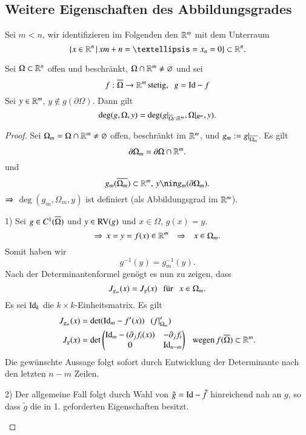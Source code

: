 \subsection{Weitere Eigenschaften des Abbildungsgrades}

Sei $m<n$, wir identifizieren im Folgenden den $\mathbb{R}^m$ mit dem Unterraum
\[
    \{x\in \R^n \, | \, x{m+n}=…=x_n=0\}\subset \R^n.
\]

\begin{theorem}\label{2.14}
    Sei $\Omega \subset \mathbb{R}^n$ offen und beschränkt, $\Omega \cap \mathbb{R}^m \neq \varnothing$ und sei
    \[
        f:\overline \Omega \rightarrow \mathbb{R}^m\, \text{stetig,} \hspace{.25cm} g=\mathrm{Id}-f
    \]
    Sei $y\in \mathbb{R}^m$, $y\nin g(\partial \Omega)$. Dann gilt
    \[
        \deg(g,\Omega,y)=\deg(g|_{\overline{\Omega}\cap\mathbb{R}^m},\Omega|_{R^m},y).
    \]
\end{theorem}

\begin{proof}
    Sei $\Omega_m=\Omega\cap\mathbb{R}^m\neq \varnothing$ offen, beschränkt im $\mathbb{R}^m$, und
    $g_m:=g|_{\overline{\Omega_m}}$. Es gilt
    \[
        \partial \Omega_m=\partial\Omega\cap\mathbb{R}^m.
    \]
    und
    \[
        g_m(\ol{\Omega_m})\subset\R^m,\, y\nin g_m(\partial\Omega_m).
    \]
    $\Rightarrow$ $\deg(g_m,\Omega_m,y)$ ist definiert (als Abbildungsgrad im $\mathbb{R}^m$).
    \begin{description}
        \item{1)}
        Sei $g\in C^1(\overline \Omega)$ und $y\in \mathrm{RV}(g)$ und $x\in \Omega$, $g(x)=y$.
        \[
        \Rightarrow \, x=y=f(x)\in \mathbb{R}^m \hspace{.25cm} \Rightarrow \hspace{.25cm} x\in \Omega_m.
        \]
        Somit haben wir
        \[
            g^{-1}(y)=g_m^{-1}(y).
        \]
        Nach der Determinantenformel genögt es nun zu zeigen, dass
        \[
            J_{g_m}(x)=J_g(x) \hspace{.25cm} \text{für} \hspace{.25cm} x\in \Omega_m.
        \]
        Es sei $\mathrm{Id}_k$ die $k\times k$-Einheitsmatrix. Es gilt
        \begin{align*}
            J_{g_m}(x)&=\det(\mathrm{Id}_m-f'(x)) \hspace{.25cm} (f|_{\Omega_m}')\\
            J_g(x)&= \det\begin{pmatrix} \mathrm{Id}_m-(\partial_jf_i(x)) & -\partial_jf_i\\
            0& \mathrm{Id}_{n-m}\end{pmatrix} \hspace{.25cm} \text{wegen} \, f(\overline\Omega)\subset\mathbb{R}^m.
        \end{align*}
        Die gewünschte Aussage folgt sofort durch Entwicklung der Determinante nach den letzten
        $n-m$ Zeilen.
        \item{2)}
        Der allgemeine Fall folgt durch Wahl von $\tilde g=\mathrm{Id}-\tilde f$ hinreichend nah an $g$, so dass
        $\tilde g$ die in 1. geforderten Eigenschaften besitzt.
    \end{description}
    \[ \]
\end{proof}
